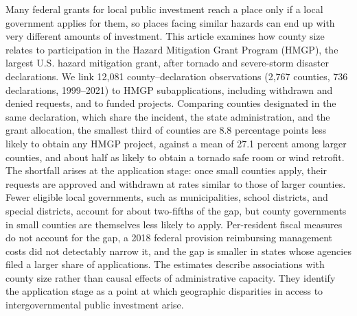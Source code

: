 Many federal grants for local public investment reach a place only if a local government applies for them, so places facing similar hazards can end up with very different amounts of investment. This article examines how county size relates to participation in the Hazard Mitigation Grant Program (HMGP), the largest U.S. hazard mitigation grant, after tornado and severe-storm disaster declarations. We link 12,081 county--declaration observations (2,767 counties, 736 declarations, 1999--2021) to HMGP subapplications, including withdrawn and denied requests, and to funded projects. Comparing counties designated in the same declaration, which share the incident, the state administration, and the grant allocation, the smallest third of counties are 8.8 percentage points less likely to obtain any HMGP project, against a mean of 27.1 percent among larger counties, and about half as likely to obtain a tornado safe room or wind retrofit. The shortfall arises at the application stage: once small counties apply, their requests are approved and withdrawn at rates similar to those of larger counties. Fewer eligible local governments, such as municipalities, school districts, and special districts, account for about two-fifths of the gap, but county governments in small counties are themselves less likely to apply. Per-resident fiscal measures do not account for the gap, a 2018 federal provision reimbursing management costs did not detectably narrow it, and the gap is smaller in states whose agencies filed a larger share of applications. The estimates describe associations with county size rather than causal effects of administrative capacity. They identify the application stage as a point at which geographic disparities in access to intergovernmental public investment arise.
